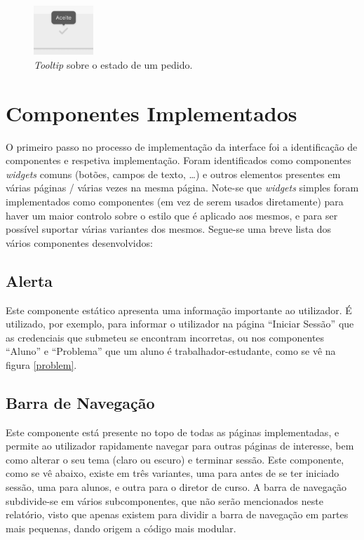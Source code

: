\documentclass[12pt, a4paper]{article}
\begin{document}
\begin{figure}[H]
    \centering
    \includegraphics[width=0.2\textwidth]{res/prototype/estado-pedido-tooltip.png}
    \caption{\emph{Tooltip} sobre o estado de um pedido.}
    \label{estado-pedido-tooltip}
\end{figure}

\section{Componentes Implementados}

O primeiro passo no processo de implementação da interface foi a identificação de componentes e
respetiva implementação. Foram identificados como componentes \emph{widgets} comuns (botões, campos
de texto, \ldots) e outros elementos presentes em várias páginas / várias vezes na mesma página.
Note-se que \emph{widgets} simples foram implementados como componentes (em vez de serem usados
diretamente) para haver um maior controlo sobre o estilo que é aplicado aos mesmos, e para ser
possível suportar várias variantes dos mesmos. Segue-se uma breve lista dos vários componentes
desenvolvidos:

\subsection{Alerta}

Este componente estático apresenta uma informação importante ao utilizador. É utilizado, por
exemplo, para informar o utilizador na página ``Iniciar Sessão'' que as credenciais que submeteu se
encontram incorretas, ou nos componentes ``Aluno'' e ``Problema'' que um aluno é
trabalhador-estudante, como se vê na figura \ref{problem}.

\subsection{Barra de Navegação}

Este componente está presente no topo de todas as páginas implementadas, e permite ao utilizador
rapidamente navegar para outras páginas de interesse, bem como alterar o seu tema (claro ou escuro)
e terminar sessão. Este componente, como se vê abaixo, existe em três variantes, uma para antes de
se ter iniciado sessão, uma para alunos, e outra para o diretor de curso. A barra de navegação
subdivide-se em vários subcomponentes, que não serão mencionados neste relatório, visto que apenas
existem para dividir a barra de navegação em partes mais pequenas, dando origem a código mais
modular.
\end{document}
